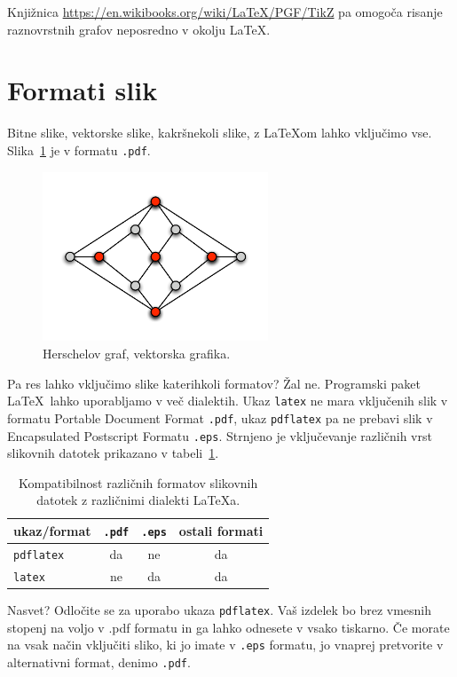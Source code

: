 \documentclass[a4paper, 12pt]{book}
\begin{document}
Knjižnica \url{https://en.wikibooks.org/wiki/LaTeX/PGF/TikZ} 
pa omo\-go\-ča risanje raznovrstnih grafov neposredno v okolju \LaTeX .


\section{Formati slik}

Bitne slike, vektorske slike, kakršnekoli slike, z \LaTeX{}om lahko vključimo vse.
Slika~\ref{pic1} je v formatu {\tt .pdf}.
\begin{figure}[h]
\begin{center}
\includegraphics[width=0.6\textwidth]{pic1.pdf}
\end{center}
\caption{Herschelov graf, vektorska grafika.}
\label{pic1}
\end{figure}
Pa res lahko vključimo slike katerihkoli formatov? 
Žal ne. 
Programski paket \LaTeX\ lahko uporabljamo v več dialektih. 
Ukaz {\tt latex} ne mara vključenih slik v formatu Portable Document Format {\tt .pdf}, ukaz {\tt pdflatex} pa ne prebavi slik v Encapsulated Postscript Formatu {\tt .eps}.
Strnjeno je vključevanje različnih vrst slikovnih datotek prikazano v tabeli~\ref{tbl:1}.

\begin{table}
\begin{center}
\begin{tabular}{l|ccc}
ukaz/format & {\tt .pdf} & {\tt .eps} & ostali formati \\ \hline
{\tt pdflatex} & da & ne & da \\
{\tt latex}   & ne & da  & da
\end{tabular}
\end{center}
\caption{Kompatibilnost različnih formatov slikovnih datotek z različnimi dialekti  \LaTeX a.}
\label{tbl:1}
\end{table}

Nasvet? 
Odločite se za uporabo ukaza {\tt pdflatex}. Vaš izdelek bo brez vmesnih stopenj na voljo v {.pdf} formatu in ga lahko odnesete v vsako tiskarno. 
Če morate na vsak način vključiti sliko, ki jo imate v {\tt .eps} formatu, jo vnaprej pretvorite v alternativni format, denimo {\tt .pdf}.
\end{document}
